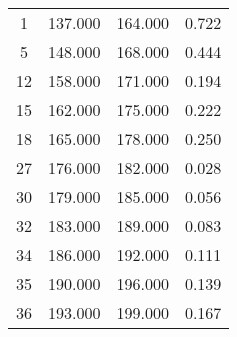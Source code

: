 % 
\begin{tabular}{cccc}
  \hline
  \hline
1 & 137.000 & 164.000 & 0.722 \\ 
  5 & 148.000 & 168.000 & 0.444 \\ 
  12 & 158.000 & 171.000 & 0.194 \\ 
  15 & 162.000 & 175.000 & 0.222 \\ 
  18 & 165.000 & 178.000 & 0.250 \\ 
  27 & 176.000 & 182.000 & 0.028 \\ 
  30 & 179.000 & 185.000 & 0.056 \\ 
  32 & 183.000 & 189.000 & 0.083 \\ 
  34 & 186.000 & 192.000 & 0.111 \\ 
  35 & 190.000 & 196.000 & 0.139 \\ 
  36 & 193.000 & 199.000 & 0.167 \\ 
   \hline
\end{tabular}

